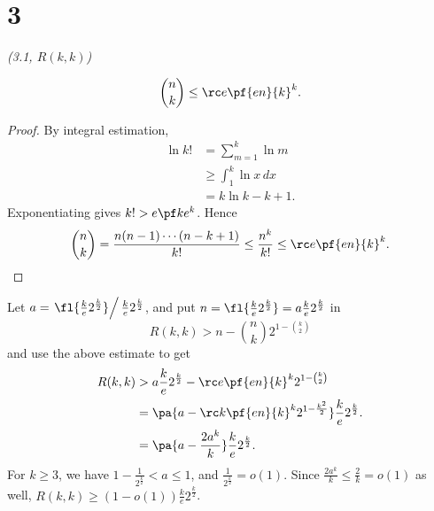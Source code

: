 \section{3}
\begin{problem}{\it (3.1, $R(k,k)$)}
\begin{lem}\label{binomest}
\[
\binom nk \le \rc e\pf{en}{k}^k.
\]
\end{lem}
\begin{proof}
By integral estimation,
\begin{align*}
\ln k!&=\sum_{m=1}^k \ln m\\
&\ge \int_{1}^k\ln x\,dx\\
&=k\ln k-k+1.
\end{align*}
Exponentiating gives $k!>e\pf ke^k$. Hence
\[
\binom nk=\frac{n(n-1)\cdots (n-k+1)}{k!}\le\frac{n^k}{k!}\le \rc e\pf{en}{k}^k.
\]
\end{proof}

Let $a=\left.\fl{\frac ke2^{\frac k2}}\right/\frac ke2^{\frac k2}$, and 
put $n=\fl{\frac ke2^{\frac k2}}=a\frac ke2^{\frac k2}$ in
\[
R(k,k)> n-\binom nk 2^{1-\binom k2}
\]
and use the above estimate to get
\begin{align*}
R(k,k)&>a\frac ke 2^{\frac k2}-\rc e\pf{en}{k}^k 2^{1-\binom k2}\\
&=\pa{a-\rc k\pf{en}{k}^k 2^{1-\frac{k^2}{2}}}\frac ke 2^{\frac k2}.\\
&=\pa{a-\frac {2a^k}k}\frac ke 2^{\frac k2}.
\end{align*}
For $k\ge 3$, we have $1-\frac{1}{2^{\frac k2}}<a\le 1$, and $\frac{1}{2^{\frac k2}}=o(1)$. Since $\frac {2a^k}k\le \frac{2}{k}=o(1)$ as well,  %
$R(k,k)\ge (1-o(1))\frac ke 2^{\frac k2}$.
\end{problem}
